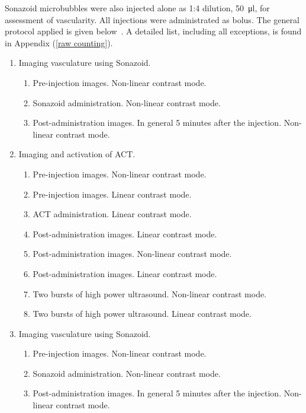 Sonazoid\texttrademark{} microbubbles were also injected alone as 1:4 dilution, \SI{50}{\micro\litre}, for assessment of vascularity. All injections were administrated as bolus. The general protocol applied is given below~\cite{Healey2014}. A detailed list, including all exceptions, is found in Appendix (\ref{raw counting}).
\FloatBarrier
\begin{enumerate}
	\item Imaging vasculature using Sonazoid\texttrademark{}.
		\begin{enumerate}
		\item Pre-injection images. Non-linear contrast mode.
		\item Sonazoid\texttrademark{} administration. Non-linear contrast mode.
		\item Post-administration images. In general 5 minutes after the injection. Non-linear contrast mode.
		\end{enumerate}
	\item Imaging and activation of ACT\texttrademark{}.
		\begin{enumerate}
		\item Pre-injection images. Non-linear contrast mode.
		\item Pre-injection images. Linear contrast mode.
		\item ACT\texttrademark{} administration. Linear contrast mode.
		\item Post-administration images. Linear contrast mode.
		\item Post-administration images. Non-linear contrast mode.
		\item Post-administration images. Linear contrast mode.
		\item Two bursts of high power ultrasound. Non-linear contrast mode.
		\item Two bursts of high power ultrasound. Linear contrast mode.
		\end{enumerate}
	\item Imaging vasculature using Sonazoid\texttrademark{}.
		\begin{enumerate}
		\item Pre-injection images. Non-linear contrast mode.
		\item Sonazoid\texttrademark{} administration. Non-linear contrast mode.
		\item Post-administration images. In general 5 minutes after the injection. Non-linear contrast mode.
		\end{enumerate}
\end{enumerate}  
 

